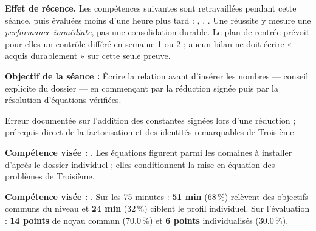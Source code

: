 \documentclass[10pt,a4paper]{article}
\begin{document}
\begin{warningbox}\textbf{Effet de récence.} Les compétences suivantes sont retravaillées pendant cette séance, puis évaluées moins d'une heure plus tard : , , . Une réussite y mesure une \emph{performance immédiate}, pas une consolidation durable. Le plan de rentrée prévoit pour elles un contrôle différé en semaine 1 ou 2 ; aucun bilan ne doit écrire « acquis durablement » sur cette seule preuve.\end{warningbox}
\begin{goalbox}\textbf{Objectif de la séance :} Écrire la relation avant d'insérer les nombres — conseil explicite du dossier — en commençant par la réduction signée puis par la résolution d'équations vérifiées.\end{goalbox}
Erreur documentée sur l'addition des constantes signées lors d'une réduction ; prérequis direct de la factorisation et des identités remarquables de Troisième.
\par\vspace{1mm}\textbf{Compétence visée :} .
Les équations figurent parmi les domaines à installer d'après le dossier individuel ; elles conditionnent la mise en équation des problèmes de Troisième.
\par\vspace{1mm}\textbf{Compétence visée :} .
Sur les 75 minutes : \textbf{51 min} (68\,\%) relèvent des objectifs communs du niveau et \textbf{24 min} (32\,\%) ciblent le profil individuel. Sur l'évaluation : \textbf{14 points} de noyau commun (70.0\,\%) et \textbf{6 points} individualisés (30.0\,\%).
\newpage{}
\end{document}

